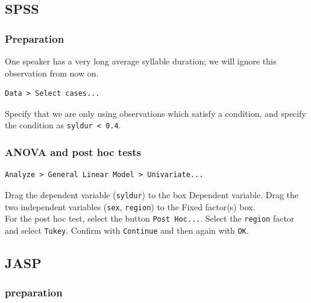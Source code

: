 \documentclass[
]{book}
\begin{document}
\hypertarget{spss-13}{%
\subsection{SPSS}\label{spss-13}}

\hypertarget{preparation-4}{%
\subsubsection{Preparation}\label{preparation-4}}

One speaker has a very long average syllable duration; we will ignore this
observation from now on.

\begin{verbatim}
Data > Select cases...
\end{verbatim}

Specify that we are only using observations which satisfy a condition,
and specify the condition as \texttt{syldur\ \textless{}\ 0.4}.

\hypertarget{anova-and-post-hoc-tests}{%
\subsubsection{ANOVA and post hoc tests}\label{anova-and-post-hoc-tests}}

\begin{verbatim}
Analyze > General Linear Model > Univariate...
\end{verbatim}

Drag the dependent variable (\texttt{syldur}) to the box Dependent
variable. Drag the two independent variables (\texttt{sex}, \texttt{region}) to the
Fixed factor(s) box.\\
For the post hoc test, select the button \texttt{Post\ Hoc...}. Select the
\texttt{region} factor and select \texttt{Tukey}. Confirm with \texttt{Continue} and then again
with \texttt{OK}.

\hypertarget{jasp-14}{%
\subsection{JASP}\label{jasp-14}}

\hypertarget{preparation-5}{%
\subsubsection{preparation}\label{preparation-5}}
\end{document}
